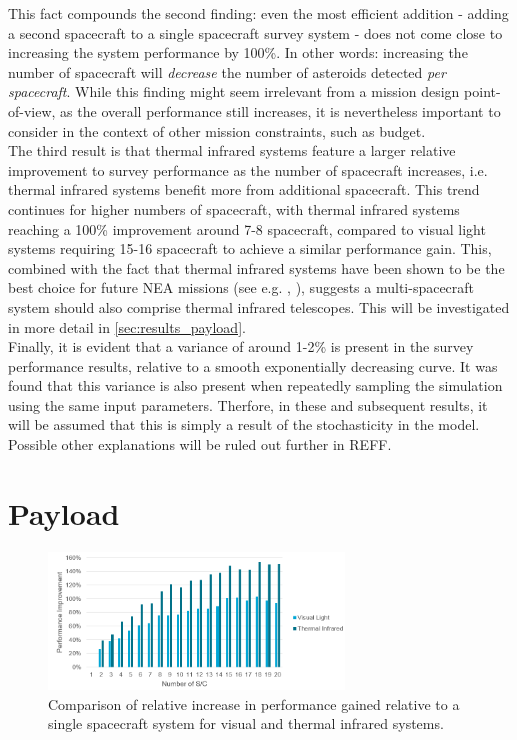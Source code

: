 This fact compounds the second finding: even the most efficient addition - adding a second spacecraft to a single spacecraft survey system - does not come close to increasing the system performance by 100\%. In other words: increasing the number of spacecraft will \textit{decrease} the number of asteroids detected \textit{per spacecraft}. While this finding might seem irrelevant from a mission design point-of-view, as the overall performance still increases, it is nevertheless important to consider in the context of other mission constraints, such as budget. \\

The third result is that thermal infrared systems feature a larger relative improvement to survey performance as the number of spacecraft increases, i.e. thermal infrared systems benefit more from additional spacecraft. This trend continues for higher numbers of spacecraft, with thermal infrared systems reaching a 100\% improvement around 7-8 spacecraft, compared to visual light systems requiring 15-16 spacecraft to achieve a similar performance gain. This, combined with the fact that thermal infrared systems have been shown to be the best choice for future NEA missions (see e.g. \cite{2017NEOSDT}, \cite{ThesisOlga}), suggests a multi-spacecraft system should also comprise thermal infrared telescopes. This will be investigated in more detail in \autoref{sec:results_payload}.\\

Finally, it is evident that a variance of around 1-2\% is present in the survey performance results, relative to a smooth exponentially decreasing curve. It was found that this variance is also present when repeatedly sampling the simulation using the same input parameters. Therfore, in these and subsequent results, it will be assumed that this is simply a result of the stochasticity in the model. Possible other explanations will be ruled out further in REFF.

\section{Payload}
\label{sec:results_payload}
\begin{figure}[htbp]
 \centering
 \includegraphics[width=0.7\textwidth]{img/tir_vs_vis_many.png}
 \caption{Comparison of relative increase in performance gained relative to a single spacecraft system for visual and thermal infrared systems.}
 \label{fig:tir_vs_vis_many}
\end{figure}

